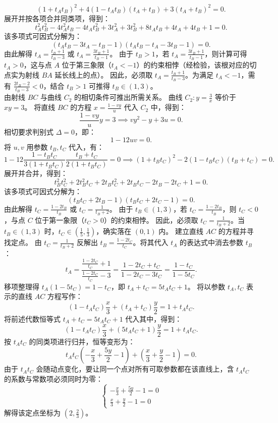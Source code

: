 \begin{solution}
\[
(1+t_At_B)^2 + 4(1-t_At_B)(t_A+t_B) + 3(t_A+t_B)^2 = 0.
\]
展开并按各项合并同类项，得到：
\[
t_A^2t_B^2 - 4t_A^2t_B - 4t_At_B^2 + 3t_A^2 + 3t_B^2 + 8t_At_B + 4t_A + 4t_B + 1 = 0.
\]
该多项式可因式分解为：
\[
(t_At_B - 3t_A - t_B - 1)(t_At_B - t_A - 3t_B - 1) = 0.
\]
由此解得 $t_A = \frac{t_B+1}{t_B-3}$ 或 $t_A = \frac{3t_B+1}{t_B-1}$。
由于 $t_B > 1$，若 $t_A = \frac{3t_B+1}{t_B-1}$，则计算可得 $t_A > 0$，这与点 $A$ 位于第三象限（$t_A < -1$）的约束相悖（经检验，该根对应的切点实为射线 $BA$ 延长线上的点）。
因此，必须取 $t_A = \frac{t_B+1}{t_B-3}$。为满足 $t_A < -1$，需有 $\frac{2t_B-2}{t_B-3} < 0$，结合 $t_B > 1$ 可推得 $t_B \in (1, 3)$。\\
由射线 $BC$ 与曲线 $C_2$ 的相切条件可推出所需关系。
曲线 $C_2: y = \frac{3}{x}$ 等价于 $xy = 3$。
将直线 $BC$ 的方程 $x = \frac{1-vy}{u}$ 代入 $C_2$ 中，得到：
\[
\frac{1-vy}{u}y = 3 \implies vy^2 - y + 3u = 0.
\]
相切要求判别式 $\Delta = 0$，即：
\[
1 - 12uv = 0.
\]
将 $u, v$ 用参数 $t_B, t_C$ 代入，有：
\[
1 - 12 \frac{1-t_Bt_C}{3(1+t_Bt_C)} \frac{t_B+t_C}{2(1+t_Bt_C)} = 0 \implies (1+t_Bt_C)^2 - 2(1-t_Bt_C)(t_B+t_C) = 0.
\]
展开并合并，得到：
\[
t_B^2t_C^2 + 2t_B^2t_C + 2t_Bt_C^2 + 2t_Bt_C - 2t_B - 2t_C + 1 = 0.
\]
该多项式可因式分解为：
\[
(t_Bt_C + 2t_B - 1)(t_Bt_C + 2t_C - 1) = 0.
\]
由此解得 $t_C = \frac{1-2t_B}{t_B}$ 或 $t_C = \frac{1}{t_B+2}$。
由于 $t_B \in (1, 3)$，若 $t_C = \frac{1-2t_B}{t_B}$，则 $t_C < 0$，与点 $C$ 位于第一象限（$t_C > 0$）的约束相悖。
因此，必须取 $t_C = \frac{1}{t_B+2}$。当 $t_B \in (1, 3)$ 时，$t_C \in \left(\frac{1}{5}, \frac{1}{3}\right)$，确实落在 $(0, 1)$ 内。
建立直线 $AC$ 的方程并寻找定点。
由 $t_C = \frac{1}{t_B+2}$ 反解出 $t_B = \frac{1-2t_C}{t_C}$。将其代入 $t_A$ 的表达式中消去参数 $t_B$：
\[
t_A = \frac{\frac{1-2t_C}{t_C} + 1}{\frac{1-2t_C}{t_C} - 3} = \frac{1-2t_C+t_C}{1-2t_C-3t_C} = \frac{1-t_C}{1-5t_C}.
\]
移项整理得 $t_A(1-5t_C) = 1-t_C$，即 $t_A + t_C = 5t_At_C + 1$。
将以参数 $t_A, t_C$ 表示的直线 $AC$ 方程写作：
\[
(1-t_At_C)\frac{x}{3} + (t_A+t_C)\frac{y}{2} = 1 + t_At_C.
\]
将前述代数恒等式 $t_A+t_C = 5t_At_C + 1$ 代入其中，得到：
\[
(1-t_At_C)\frac{x}{3} + (5t_At_C+1)\frac{y}{2} = 1 + t_At_C.
\]
按 $t_At_C$ 的同类项进行归并，恒等变形为：
\[
t_At_C \left( -\frac{x}{3} + \frac{5y}{2} - 1 \right) + \left( \frac{x}{3} + \frac{y}{2} - 1 \right) = 0.
\]
由于 $t_At_C$ 会随动点变化，要让同一个点对所有可取参数都在该直线上，含 $t_At_C$ 的系数与常数项必须同时为零：
\[
\begin{cases}
-\frac{x}{3} + \frac{5y}{2} - 1 = 0 \\
\frac{x}{3} + \frac{y}{2} - 1 = 0
\end{cases}
\]
解得该定点坐标为 $\left(2, \frac{2}{3}\right)$。
\end{solution}


